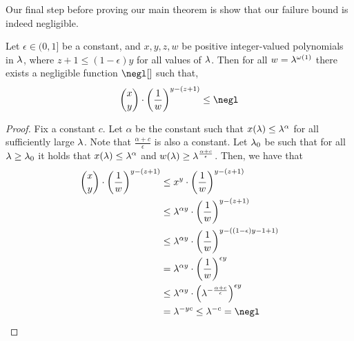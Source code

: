 Our final step before proving our main theorem is show that our failure bound is indeed negligible.

\begin{lemma}
	\label{lem:mdss-asym-bound}
	Let $\epsilon \in (0, 1]$ be a constant, and $x, y, z, w$ be positive integer-valued polynomials in $\lambda$, where $z + 1\leq (1 - \epsilon)y$ for all values of $\lambda$.
	Then for all $w = \lambda^{\omega(1)}$ there exists a negligible function $\negl[]$ such that,
	$$
		\binom{x}{y} \cdot \left(\frac{1}{w}\right)^{y - (z + 1)} \leq \negl
	$$
\end{lemma}

\begin{proof}
	Fix a constant $c$.
	Let $\alpha$ be the constant such that $x(\lambda) \leq \lambda^\alpha$ for all sufficiently large $\lambda$.
	Note that $\frac{\alpha + c}{\epsilon}$ is also a constant.
	Let $\lambda_0$ be such that for all $\lambda \geq \lambda_0$ it holds that $x(\lambda) \leq \lambda^\alpha$ and $w(\lambda) \geq \lambda^{\frac{\alpha + c}{\epsilon}}$.
	Then, we have that
	\begin{align*}
		\binom{x}{y} \cdot \left(\frac{1}{w}\right)^{y - (z + 1)}
		 & \leq  x^y\cdot \left(\frac{1}{w}\right)^{y - (z + 1)}                                           \\
		 & \leq  \secpar^{\alpha y}\cdot \left(\frac{1}{w}\right)^{y - (z + 1)}                            \\
		 & \leq  \secpar^{\alpha y} \cdot \left(\frac{1}{w}\right)^{y - ((1 - \epsilon)y -1 + 1)}          \\
		 & =  \secpar^{\alpha y} \cdot \left(\frac{1}{w}\right)^{\epsilon y}                               \\
		 & \leq  \secpar^{\alpha y} \cdot \left(\secpar^{-\frac{\alpha + c}{\epsilon}}\right)^{\epsilon y} \\
		 & =  \secpar^{-yc} \leq \secpar^{-c} = \negl
	\end{align*}
\end{proof}


